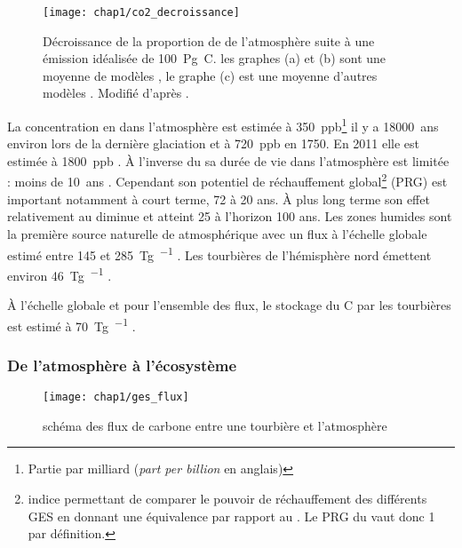 \begin{figure}
\centering
\texttt{[image: chap1/co2\_decroissance]}
\caption{Décroissance de la proportion de \coo de l'atmosphère suite à une émission idéalisée de \SI{100}{\peta\gram C}. les graphes (a) et (b) sont une moyenne de modèles \citep{joos2013}, le graphe (c) est une moyenne d'autres modèles \citep{archer2009}. Modifié d'après \citep{Ciais2014}.}
\label{fig:co2_decroissance}
\end{figure}


La concentration en \chh dans l'atmosphère est estimée à \SI{350}{ppb}\footnote{Partie par milliard (\textit{part per billion} en anglais)} il y a \SI{18000}{ans} environ lors de la dernière glaciation et à \SI{720}{ppb} en 1750.
En 2011 elle est estimée à \SI{1800}{ppb} \citep{Ciais2014}.
À l'inverse du \coo sa durée de vie dans l'atmosphère est limitée : moins de \SI{10}{ans} \citep{lelieveld1998,prather2012}.
Cependant son potentiel de réchauffement global\footnote{indice permettant de comparer le pouvoir de réchauffement des différents GES en donnant une équivalence par rapport au \coo. Le PRG du \coo vaut donc 1 par définition.} (PRG) est important notamment à court terme, 72 à 20 ans.
À plus long terme son effet relativement au \coo diminue et atteint 25 à l'horizon 100 ans.
Les zones humides sont la première source naturelle de \chh atmosphérique avec un flux à l'échelle globale estimé entre \num{145} et \SI{285}{\tera\gram\per\year} \citep{lelieveld1998,wuebbles2002,Ciais2014}. %
Les tourbières de l'hémisphère nord émettent environ \SI{46}{\tera\gram\per\year} \citep{gorham1991}. %


À l'échelle globale et pour l'ensemble des flux, le stockage du C par les tourbières est estimé à \SI{70}{\tera\gram\per\year} \citep{clymo1998}.


\subsubsection{De l'atmosphère à l'écosystème}

\begin{figure}
\centering
\texttt{[image: chap1/ges\_flux]}
\caption{schéma des flux de carbone entre une tourbière et l'atmosphère}
\label{fig:ges_flux}
\end{figure}

